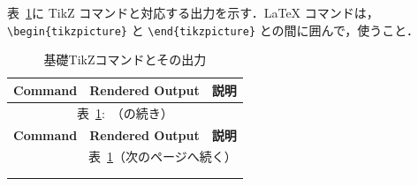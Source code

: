 \documentclass[lualatex]{jlreq}
\begin{document}
表~\ref{tab:basictikzcommandoutput}に TikZ コマンドと対応する出力を示す．\LaTeX{} コマンドは，\verb|\begin{tikzpicture}| と \verb|\end{tikzpicture}| との間に囲んで，使うこと．

\newcommand{\cwA}{5.5cm} %
\newcommand{\cwB}{4cm} %
\newcommand{\cwC}{5.5cm} %
\newcommand{\tablerowseparatorline}{
    \addlinespace[0.3em]
    \cmidrule{1-3}
    \addlinespace[0.2em]
}
\begin{longtable}{p{\cwA} p{\cwB} p{\cwC}}
    \caption{基礎TikZコマンドとその出力} \label{tab:basictikzcommandoutput}                                      \\[-1em]
    \toprule
    \textbf{Command} & \textbf{Rendered Output} & \textbf{説明}                                         \\
    \midrule
    \endfirsthead %

    \multicolumn{3}{c}{表~\ref{tab:basictikzcommandoutput}:~\nameref{tab:basictikzcommandoutput}（の続き）} \\[0.3em]
    \toprule
    \textbf{Command} & \textbf{Rendered Output} & \textbf{説明}                                         \\
    \midrule
    \endhead %

    \multicolumn{3}{r}{表~\ref{tab:basictikzcommandoutput}（次のページへ続く）}                                  \\
    \midrule
    \endfoot %

    \midrule
    \multicolumn{3}{r}{表~\ref{tab:basictikzcommandoutput}終了}                                          \\
    \bottomrule
    \endlastfoot %


\end{longtable}
\end{document}
